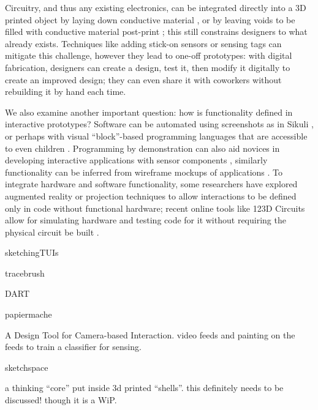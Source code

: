     Circuitry, and thus any existing electronics, can be integrated directly into a 3D printed object by laying down conductive material \cite{sells-reprap,voxel8}, or by leaving voids to be filled with conductive material post-print \cite{savage-sot}; this still constrains designers to what already exists. Techniques like adding stick-on sensors or sensing tags \cite{maynes-aminzade-eyepatch,yeo-stickear} can mitigate this challenge, however they lead to one-off prototypes: with digital fabrication, designers can create a design, test it, then modify it digitally to create an improved design; they can even share it with coworkers without rebuilding it by hand each time.
    
    We also examine another important question: how is functionality defined in interactive prototypes? Software can be automated using screenshots as in Sikuli \cite{yeh-sikuli}, or perhaps with visual ``block''-based programming languages that are accessible to even children \cite{resnick-scratch}. Programming by demonstration can also aid novices in developing interactive applications with sensor components \cite{hartmann-dtools}, similarly functionality can be inferred from wireframe mockups of applications \cite{li-framewire}. To integrate hardware and software functionality, some researchers have explored augmented reality \cite{nam-AR} or projection \cite{akaoka-displayobjects} techniques to allow interactions to be defined only in code without functional hardware; recent online tools like 123D Circuits allow for simulating hardware and testing code for it without requiring the physical circuit be built \cite{123dcircuits}.
    

    \cite{nam-sketchingtuis} sketchingTUIs
    
    \cite{sarik-tracebrush} tracebrush
    
    \cite{macintyre-DART} DART
    
    \cite{klemmer-papiermache} papiermache
    
    \cite{fails-crayons} A Design Tool for Camera-based Interaction. video feeds and painting on the feeds to train a classifier for sensing.
    
    \cite{holman-sketchspace} sketchspace
    
    \cite{doering-composition} a thinking ``core'' put inside 3d printed ``shells''. this definitely needs to be discussed! though it is a WiP.
    
    \cite{hook-study}